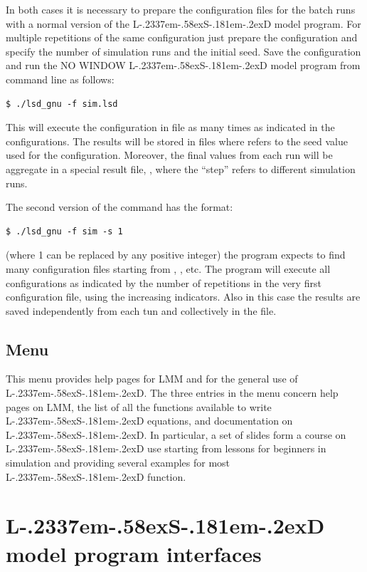 \documentclass [11pt,a4paper] {book}
\def\LsD{{L\kern-.2337em\lower-.58ex\hbox{S}\kern-.181em\lower-.2ex\hbox{D}}\xspace}
\begin{document}
In both cases it is necessary to prepare the configuration files for the batch runs with a normal version of the \LsD model program. For multiple repetitions of the same configuration just prepare the configuration and specify the number of simulation runs and the initial seed. Save the configuration and run the NO WINDOW \LsD model program from command line as follows:

\begin{verbatim}
$ ./lsd_gnu -f sim.lsd
\end{verbatim} 

This will execute the configuration in file  as many times as indicated in the configurations. The results will be stored in files  where  refers to the seed value used for the configuration. Moreover, the final values from each run will be aggregate in a special result file, , where the ``step'' refers to different simulation runs.

The second version of the command has the format:

\begin{verbatim}
$ ./lsd_gnu -f sim -s 1
\end{verbatim} 

(where 1 can be replaced by any positive integer) the program expects to find many configuration files starting from , , etc. The program will execute all configurations as indicated by the number of repetitions in the very first configuration file, using the increasing indicators. Also in this case the results are saved independently from each tun and collectively in the  file.


\subsection{Menu }

This menu provides help pages for LMM and for the general use of \LsD. The three entries in the menu concern help pages on LMM, the list of all the functions available to write \LsD equations, and documentation on \LsD. In particular, a set of slides form a course on \LsD use starting from lessons for beginners in simulation and providing several examples for most \LsD function.


\section{\LsD model program interfaces}\label{sec:lsd}
\end{document}
